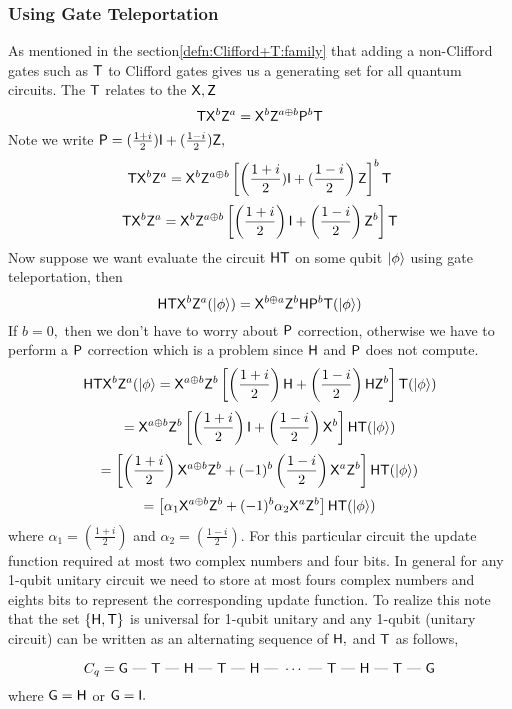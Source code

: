 \subsubsection{Using Gate Teleportation}
As mentioned in the section\ref{defn:Clifford+T:family} that adding a non-Clifford gates  such as ${\sf T}$ to Clifford gates gives us a generating set for all quantum circuits. The ${\sf T}$ relates to the ${\sf X}, {\sf Z}$  
$${\sf T} {\sf X}^b {\sf Z}^a={\sf X}^b {\sf Z}^{a\oplus b}{\sf P}^b {\sf T}$$
Note we write ${\sf P}=(\frac{1+i}{2}) {\sf I} + (\frac{1-i}{2}){\sf Z},$
$${\sf T} {\sf X}^b {\sf Z}^a={\sf X}^b {\sf Z}^{a\oplus b}\left[\left(\frac{1+i}{2}) {\sf I} + (\frac{1-i}{2}\right){\sf Z}\right]^b {\sf T}$$
$${\sf T} {\sf X}^b {\sf Z}^a={\sf X}^b {\sf Z}^{a\oplus b}\left[\left(\frac{1+i}{2}\right) {\sf I} + \left(\frac{1-i}{2}\right){\sf Z}^b\right] {\sf T}$$
Now suppose we  want evaluate the circuit ${\sf H} {\sf T}$ on some qubit ${\lvert}\phi\rangle$ using gate teleportation, then   
 $${\sf H} {\sf T} {\sf X}^b {\sf Z}^a ({\lvert}\phi\rangle) = {\sf X}^{b\oplus a} {\sf Z}^b {\sf H} {\sf P}^b {\sf T}({\lvert}\phi\rangle)$$
 If $b=0,$ then we don't have to worry about ${\sf P}$ correction, otherwise we have to perform a ${\sf P}$ correction which is a problem since  ${\sf H}$ and ${\sf P}$ does not compute. 
 $${\sf H} {\sf T} {\sf X}^b {\sf Z}^a ({\lvert}\phi\rangle={\sf X}^{a\oplus b} {\sf Z}^b  \left[\left(\frac{1+i}{2}\right) {\sf H} + \left(\frac{1-i}{2}\right){\sf H}{\sf Z}^b\right] {\sf T}({\lvert}\phi\rangle)$$
$$= {\sf X}^{a\oplus b} {\sf Z}^b  \left[\left(\frac{1+i}{2}\right) {\sf I} + \left(\frac{1-i}{2}\right){\sf X}^b\right] {\sf H}{\sf T}({\lvert}\phi\rangle)$$
$$=\left[\left(\frac{1+i}{2}\right){\sf X}^{a\oplus b} {\sf Z}^b  + (-1)^b\left(\frac{1-i}{2}\right)  {\sf X}^{a} {\sf Z}^b\right]{\sf H}{\sf T}({\lvert}\phi\rangle)$$
$$=\left[\alpha_1{\sf X}^{a\oplus b} {\sf Z}^b  + (-1)^b\alpha_2  {\sf X}^{a} {\sf Z}^b\right]{\sf H}{\sf T}({\lvert}\phi\rangle)$$
 where $\alpha_1=\left(\frac{1+i}{2}\right)$ and $\alpha_2=\left(\frac{1-i}{2}\right).$ For this particular circuit the update function required at most two complex numbers and four bits. 
 In general for any 1-qubit  unitary circuit we need to store at most fours complex numbers and eights bits to represent the corresponding update function. To realize this note that the set $\{{\sf H},  {\sf T}\}$ is universal for 1-qubit unitary and any 1-qubit (unitary circuit) can be written as an alternating sequence of ${\sf H},$ and ${\sf T}$ as follows, 
 
 $$C_q=\textsf{G}\mbox{ --- }{\sf T} \mbox{ --- } {\sf H} \mbox{ --- } {\sf T} \mbox{ --- } {\sf H} \mbox{ --- } \cdots \mbox{ --- } {\sf T} \mbox{ --- } {\sf H} \mbox{ --- } {\sf T} \mbox{ --- } \textsf{G}$$
  where $\textsf{G}={\sf H}$ or $\textsf{G}={\sf I}.$
  
